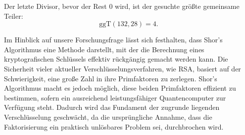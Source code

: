 Der letzte Divisor, bevor der Rest $0$ wird, ist der gesuchte größte gemeinsame Teiler: \cite{euklid}
\[
\text{ggT}(132, 28) = 4. 
\] 

Im Hinblick auf unsere Forschungsfrage lässt sich festhalten, dass Shor's Algorithmus eine 
Methode darstellt, mit der die Berechnung eines kryptografischen Schlüssels effektiv rückgängig 
gemacht werden kann. Die Sicherheit vieler aktueller Verschlüsselungsverfahren, wie RSA, basiert 
auf der Schwierigkeit, eine große Zahl in ihre Primfaktoren zu zerlegen. Shor's Algorithmus macht 
es jedoch möglich, diese beiden Primfaktoren effizient zu bestimmen, sofern ein ausreichend 
leistungsfähiger Quantencomputer zur Verfügung steht. Dadurch wird das Fundament der zugrunde 
liegenden Verschlüsselung geschwächt, da die ursprüngliche Annahme, dass die Faktorisierung ein 
praktisch unlösbares Problem sei, durchbrochen wird.


